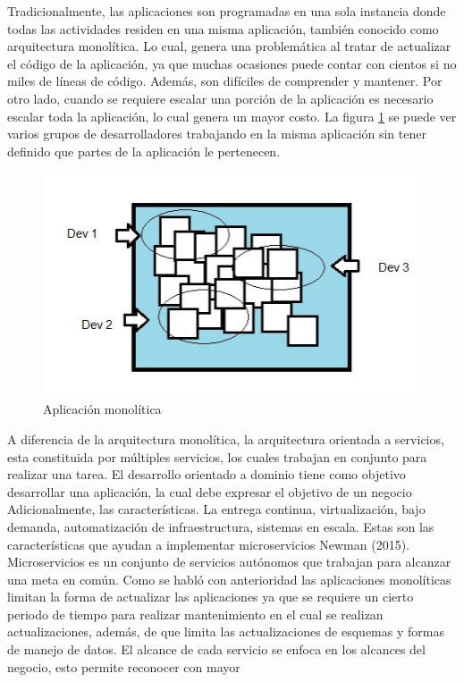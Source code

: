 \documentclass[12pt,twoside]{reedthesis}
\theoremstyle{definition}
\theoremstyle{definition}
\theoremstyle{definition}
\theoremstyle{remark}
\begin{document}
Tradicionalmente, las aplicaciones son programadas en una sola instancia
donde todas las actividades residen en una misma aplicación, también
conocido como arquitectura monolítica. Lo cual, genera una problemática
al tratar de actualizar el código de la aplicación, ya que muchas
ocasiones puede contar con cientos si no miles de líneas de código.
Además, son difíciles de comprender y mantener. Por otro lado, cuando se
requiere escalar una porción de la aplicación es necesario escalar toda
la aplicación, lo cual genera un mayor costo. La figura \ref{figura1} se
puede ver varios grupos de desarrolladores trabajando en la misma
aplicación sin tener definido que partes de la aplicación le pertenecen.
\begin{figure}[h!]
  \centering
  \includegraphics[scale=0.5]{./figure/Cap3/monoFig1.png}
  \caption{Aplicación monolítica}\label{figura1}
\end{figure}
A diferencia de la arquitectura monolítica, la arquitectura orientada a
servicios, esta constituida por múltiples servicios, los cuales trabajan
en conjunto para realizar una tarea. El desarrollo orientado a dominio
tiene como objetivo desarrollar una aplicación, la cual debe expresar el
objetivo de un negocio Adicionalmente, las características. La entrega
continua, virtualización, bajo demanda, automatización de
infraestructura, sistemas en escala. Estas son las características que
ayudan a implementar microservicios Newman (2015). Microservicios es un
conjunto de servicios autónomos que trabajan para alcanzar una meta en
común. Como se habló con anterioridad las aplicaciones monolíticas
limitan la forma de actualizar las aplicaciones ya que se requiere un
cierto periodo de tiempo para realizar mantenimiento en el cual se
realizan actualizaciones, además, de que limita las actualizaciones de
esquemas y formas de manejo de datos. El alcance de cada servicio se
enfoca en los alcances del negocio, esto permite reconocer con mayor
\end{document}
